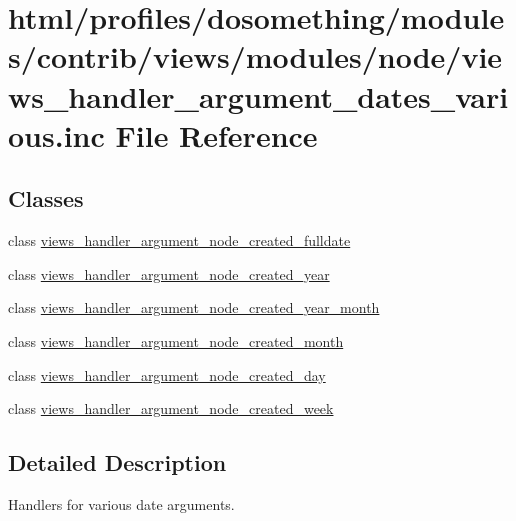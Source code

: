 \hypertarget{views__handler__argument__dates__various_8inc}{
\section{html/profiles/dosomething/modules/contrib/views/modules/node/views\_\-handler\_\-argument\_\-dates\_\-various.inc File Reference}
\label{views__handler__argument__dates__various_8inc}
}
\subsection*{Classes}
\begin{DoxyCompactItemize}
\item 
class \hyperlink{classviews__handler__argument__node__created__fulldate}{views\_\-handler\_\-argument\_\-node\_\-created\_\-fulldate}
\item 
class \hyperlink{classviews__handler__argument__node__created__year}{views\_\-handler\_\-argument\_\-node\_\-created\_\-year}
\item 
class \hyperlink{classviews__handler__argument__node__created__year__month}{views\_\-handler\_\-argument\_\-node\_\-created\_\-year\_\-month}
\item 
class \hyperlink{classviews__handler__argument__node__created__month}{views\_\-handler\_\-argument\_\-node\_\-created\_\-month}
\item 
class \hyperlink{classviews__handler__argument__node__created__day}{views\_\-handler\_\-argument\_\-node\_\-created\_\-day}
\item 
class \hyperlink{classviews__handler__argument__node__created__week}{views\_\-handler\_\-argument\_\-node\_\-created\_\-week}
\end{DoxyCompactItemize}


\subsection{Detailed Description}
Handlers for various date arguments. 